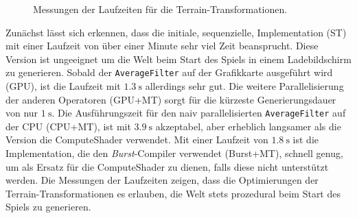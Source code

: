 \begin{figure}[ht]
    \caption[Laufzeit Terrain-Transformationen]{Messungen der Laufzeiten für die Terrain-Transformationen.}\label{fig:WG::Shader}
\end{figure}

Zunächst lässt sich erkennen, dass die initiale, sequenzielle, Implementation (ST) mit einer Laufzeit von über einer Minute sehr viel Zeit beansprucht.
Diese Version ist ungeeignet um die Welt beim Start des Spiels in einem Ladebildschirm zu generieren.
Sobald der \texttt{AverageFilter} auf der Grafikkarte ausgeführt wird (GPU), ist die Laufzeit mit $\SI{1.3}{\second}$ allerdings sehr gut.
Die weitere Parallelisierung der anderen Operatoren (GPU+MT) sorgt für die kürzeste Generierungsdauer von nur $\SI{1}{\second}$.
Die Ausführungszeit für den naiv parallelisierten \texttt{AverageFilter} auf der CPU (CPU+MT), ist mit $\SI{3.9}{\second}$ akzeptabel, aber erheblich langsamer als die Version die ComputeShader verwendet.
Mit einer Laufzeit von $\SI{1.8}{\second}$ ist die Implementation, die den \textit{Burst}-Compiler verwendet (Burst+MT), schnell genug, um als Ersatz für die ComputeShader zu dienen, falls diese nicht unterstützt werden.
Die Messungen der Laufzeiten zeigen, dass die Optimierungen der Terrain-Transformationen es erlauben, die Welt stets prozedural beim Start des Spiels zu generieren.

